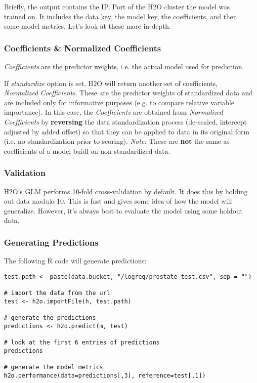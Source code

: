 \documentclass[11pt]{article}
\begin{document}
Briefly, the output contains the IP, Port of the H2O cluster the model was trained on. It includes the data key, the model key, the coefficients, and then some model metrics. Let's look at these more in-depth.

\subsubsection{Coefficients \& Normalized Coefficients}
\textit{Coefficients} are the predictor weights, i.e. the actual model used for prediction. 

If \textit{standardize} option is set, H2O will return another set of coefficients, \textit{Normalized Coefficients}. These are the predictor weights of standardized data and are included only for informative purposes (e.g. to compare relative variable importance). In this case, the \textit{Coefficients} are obtained from \textit{Normalized Coefficients} by \textbf{reversing} the data standardization process (de-scaled, intercept adjusted by added offset) so that they can be applied to data in its original form (i.e. no standardization prior to scoring). \textit{Note:} These are \textbf{not} the same as coefficients of a model buidl on non-standardized data.

\subsubsection{Validation}

H2O's GLM performs 10-fold cross-validation by default. It does this by holding out data modulo 10. This is fast and gives some idea of how the model will generalize. However, it's always best to evaluate the model using some holdout data.

\subsubsection{Generating Predictions}

The following R code will generate predictions:

\begin{verbatim}
test.path <- paste(data.bucket, "/logreg/prostate_test.csv", sep = "")

# import the data from the url
test <- h2o.importFile(h, test.path)

# generate the predictions
predictions <- h2o.predict(m, test)

# look at the first 6 entries of predictions
predictions

# generate the model metrics
h2o.performance(data=predictions[,3], reference=test[,1])
\end{verbatim}
\end{document}
